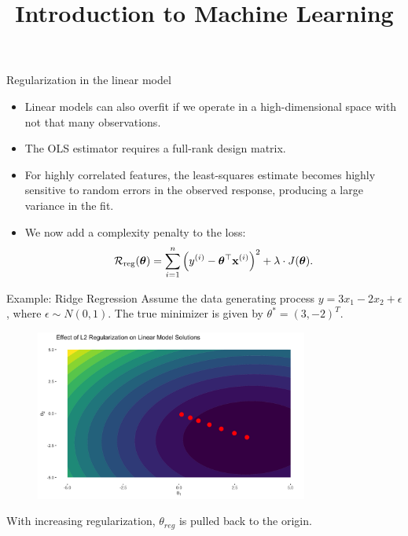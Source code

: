 \documentclass[11pt,compress,t,notes=noshow, xcolor=table]{beamer}
\title{Introduction to Machine Learning}
\date{}
\begin{document}


\begin{vbframe}{Regularization in the linear model}

  \begin{itemize} \setlength{\itemsep}{1.3em}
  \item Linear models can also overfit if we operate in a high-dimensional space with not that many observations.    
  \item The OLS estimator requires a full-rank design matrix.
  \item For highly correlated features, the least-squares estimate becomes highly sensitive to random errors in the observed response, producing a large variance in the fit. 
  \item We now add a complexity penalty to the loss:
  $$
  \mathcal{R}_{\text{reg}}(\bm{\theta}) = \sum\limits_{i=1}^n \left(y^{(i)} - \bm{\theta}^\top \mathbf{x}^{(i)} \right)^2 + \lambda \cdot J(\bm{\theta}). 
  $$ 
  \end{itemize}

\end{vbframe}

\begin{vbframe}{Example: Ridge Regression}
Assume the data generating process $y=3x_{1} -2x_{2} +\epsilon $, where $\displaystyle \epsilon \sim N( 0,1)$. The true minimizer is given by $\theta ^{*} =( 3,-2)^{T}$.

\begin{figure}
\includegraphics[width=0.8\textwidth]{figure/lin_reg_l2.png}
\end{figure}

With increasing regularization, $\theta_{\textit{reg}}$ is pulled back to the origin.

\end{vbframe}


\end{document}
